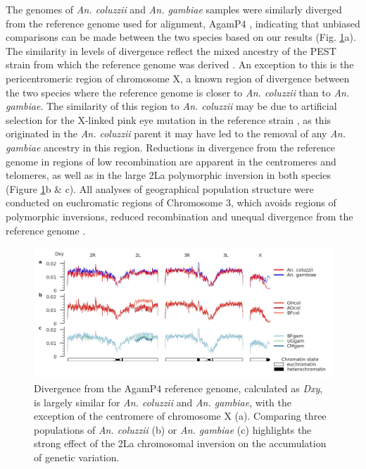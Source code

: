 \documentclass[a4paper,11pt,abstracton,hidelinks]{scrartcl}
\begin{document}
The genomes of \textit{An. coluzzii} and \textit{An. gambiae} samples were similarly diverged from the reference genome used for alignment, AgamP4 \cite{Holt2002}, indicating that unbiased comparisons can be made between the two species based on our results (Fig. \ref{refdiff}a).
%
The similarity in levels of divergence reflect the mixed ancestry of the PEST strain from which the reference genome was derived \cite{Holt2002}.
%
An exception to this is the pericentromeric region of chromosome X, a known region of divergence between the two species \cite{Ag1000gConsortium2017} where the reference genome is closer to \textit{An. coluzzii} than to \textit{An. gambiae}.
%
The similarity of this region to \textit{An. coluzzii} may be due to artificial selection for the X-linked pink eye mutation in the reference strain \cite{Holt2002}, as this originated in the \textit{An. coluzzii} parent it may have led to the removal of any \textit{An. gambiae} ancestry in this region.
%
Reductions in divergence from the reference genome in regions of low recombination are apparent in the centromeres and telomeres, as well as in the large 2La polymorphic inversion in both species \cite{coluzzi2002} (Figure \ref{refdiff}b \& c). 
%
All analyses of geographical population structure were conducted on euchromatic regions of Chromosome 3, which avoids regions of polymorphic inversions, reduced recombination and unequal divergence from the reference genome \cite{Ag1000gConsortium2017}.

\begin{figure}[h]
	\begin{center}
		\includegraphics*[width=6.3in]{notebooks/refdiff/refdiff_phase2_combined.jpg}
	\end{center}
	\caption{Divergence from the AgamP4 reference genome, calculated as \textit{Dxy}, is largely similar for \textit{An. coluzzii} and \textit{An. gambiae}, with the exception of the centromere of chromosome X (a). Comparing three populations of \textit{An. coluzzii} (b) or \textit{An. gambiae} (c) highlights the strong effect of the 2La chromosomal inversion on the accumulation of genetic variation.}
	\label{refdiff}
\end{figure}
\end{document}
